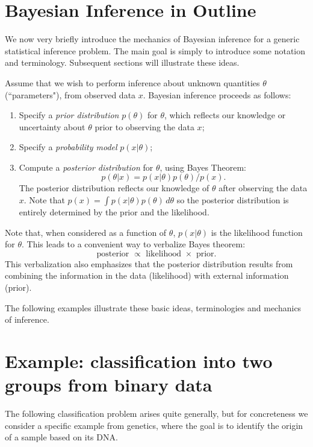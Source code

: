 \documentclass[times,11pt]{article}
\begin{document}
\section*{Bayesian Inference in Outline}

We now very briefly introduce the mechanics of Bayesian inference for a generic statistical inference problem.
The main goal is simply to introduce some notation and terminology. Subsequent sections will illustrate these ideas.

Assume that we wish to perform inference about unknown quantities $\theta$ (``parameters"), from observed data
$x$. Bayesian inference proceeds as follows:
\begin{enumerate}
\item Specify a {\it prior distribution} $p(\theta)$ for $\theta$, which reflects our knowledge or uncertainty about
$\theta$ prior to observing the data $x$;
\item Specify a {\it probability model} $p(x|\theta)$; 
\item Compute a {\it posterior distribution} for $\theta$, using Bayes Theorem: 
\begin{equation}
p(\theta | x) = p( x |\theta) p(\theta)/p( x).
\end{equation} 
The posterior distribution reflects our knowledge of $\theta$ after observing the data $x$.
Note that $p(x) = \int p(x | \theta) p(\theta) \, d\theta$ so the posterior distribution is entirely determined by the prior and the likelihood.
\end{enumerate}

Note that, when considered as a function of $\theta$, $p(x|\theta)$ is the likelihood function for $\theta$. This leads to a convenient way to verbalize Bayes theorem:  \begin{equation}
\text{posterior $\propto$ likelihood $\times$ prior.}
\end{equation}
This verbalization also emphasizes that the posterior distribution results from combining the information in the data (likelihood) with external information (prior).

The following examples illustrate these basic ideas, terminologies and mechanics of inference.

\section*{Example: classification into two groups from binary data}

The following classification problem arises quite generally, but for concreteness we consider a 
specific example from genetics, where
the goal is to identify the origin of a sample based on its DNA.
\end{document}
